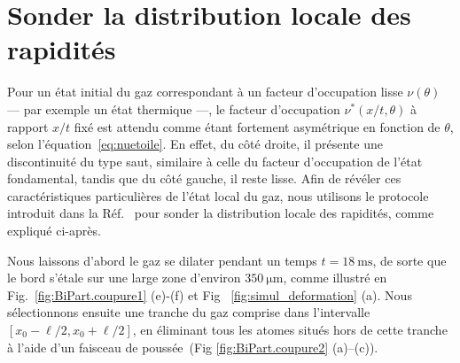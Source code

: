 \section{Sonder la distribution locale des rapidités}
\label{sec:local}

Pour un état initial du gaz correspondant à un facteur d'occupation lisse $\nu(\theta)$ — par exemple un état thermique —, le facteur d'occupation $\nu^*(x/t,\theta)$ à rapport $x/t$ fixé est attendu comme étant fortement asymétrique en fonction de $\theta$, selon l'équation~\eqref{eq:nuetoile}. En effet, du côté droite, il présente une discontinuité du type saut, similaire à celle du facteur d'occupation de l’état fondamental, tandis que du côté gauche, il reste lisse. Afin de révéler ces caractéristiques particulières de l’état local du gaz, nous utilisons le protocole introduit dans la Réf.~\cite{dubois_probing_2024} pour sonder la distribution locale des rapidités, comme expliqué ci-après.

Nous laissons d’abord le gaz se dilater pendant un temps $t=18~\mathrm{ms}$, de sorte que le bord s’étale sur une large zone d’environ $350~\mathrm{\mu m}$, comme illustré en Fig.~\ref{fig:BiPart.coupure1} (e)-(f) et  Fig ~\ref{fig:simul_deformation} (a).  
Nous sélectionnons ensuite une tranche du gaz comprise dans l’intervalle $[x_0-\ell/2, x_0+\ell/2]$, en éliminant tous les atomes situés hors de cette tranche à l’aide d’un faisceau de poussée~\cite{dubois_probing_2024}(Fig \ref{fig:BiPart.coupure2} (a)--(c)). 

